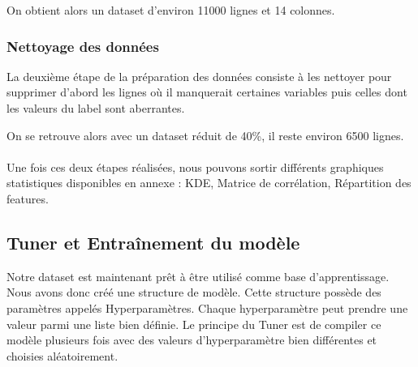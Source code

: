 On obtient alors un dataset d'environ 11000 lignes et 14 colonnes.

\subsubsection{Nettoyage des données}

La deuxième étape de la préparation des données consiste à les nettoyer pour supprimer d'abord les lignes où il manquerait certaines variables puis celles dont les valeurs du label sont aberrantes.

On se retrouve alors avec un dataset réduit de 40\%, il reste environ 6500 lignes.

\paragraph{}


Une fois ces deux étapes réalisées, nous pouvons sortir différents graphiques statistiques disponibles en annexe : KDE, Matrice de corrélation, Répartition des features.


\subsection{Tuner et Entraînement du modèle}

Notre dataset est maintenant prêt à être utilisé comme base d'apprentissage. Nous avons donc créé une structure de modèle. Cette structure possède des paramètres appelés Hyperparamètres. Chaque hyperparamètre peut prendre une valeur parmi une liste bien définie. Le principe du Tuner est de compiler ce modèle plusieurs fois avec des valeurs d'hyperparamètre bien différentes et choisies aléatoirement.

